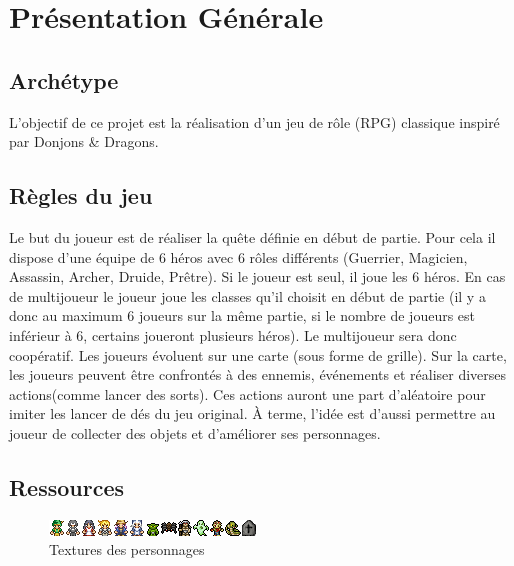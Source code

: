 \documentclass[a4paper,12pt]{article}
\begin{document}
\renewcommand{\labelitemi}{$\bullet$}

\thispagestyle{empty}



\clearpage

{\small
\tableofcontents
}



\clearpage
\section{Présentation Générale}

\subsection{Archétype}
L’objectif de ce projet est la réalisation d’un jeu de rôle (RPG) classique inspiré par Donjons \& Dragons.

\subsection{Règles du jeu}
Le but du joueur est de réaliser la quête définie en début de partie. Pour cela il dispose d'une équipe de 6 héros avec 6 rôles différents (Guerrier, Magicien, Assassin, Archer, Druide, Prêtre). Si le joueur est seul, il joue les 6 héros. En cas de multijoueur le joueur joue les classes qu'il choisit en début de partie (il y a donc au maximum 6 joueurs sur la même partie, si le nombre de joueurs est inférieur à 6, certains joueront plusieurs héros). Le multijoueur sera donc coopératif. Les joueurs évoluent sur une carte (sous forme de grille). Sur la carte, les joueurs peuvent être confrontés à des ennemis, événements et réaliser diverses actions(comme lancer des sorts). Ces actions auront une part d’aléatoire pour imiter les lancer de dés du jeu original. À terme, l’idée est d’aussi permettre au joueur de collecter des objets et d'améliorer ses personnages. 

\subsection{Ressources}

\begin{figure}[hbt!]
    \centering
    \includegraphics[scale=2, angle=0]{images/creatures.png}
    \caption{Textures des personnages}
    \label{fig:textPerso}
\end{figure}
\end{document}

